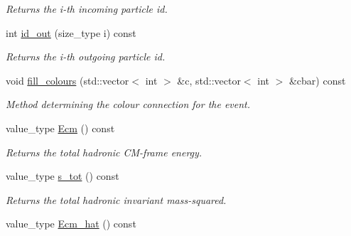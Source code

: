 \begin{DoxyCompactItemize}
\begin{DoxyCompactList}\small\item\em Returns the i-\/th incoming particle id. \end{DoxyCompactList}\item 
\hypertarget{a00212_aaa6968384f596478f21840491ceabad4}{}int \hyperlink{a00212_aaa6968384f596478f21840491ceabad4}{id\+\_\+out} (size\+\_\+type i) const \label{a00212_aaa6968384f596478f21840491ceabad4}

\begin{DoxyCompactList}\small\item\em Returns the i-\/th outgoing particle id. \end{DoxyCompactList}\item 
\hypertarget{a00212_ab6c23b5b397048e7900ea14cc07f45fc}{}void \hyperlink{a00212_ab6c23b5b397048e7900ea14cc07f45fc}{fill\+\_\+colours} (std\+::vector$<$ int $>$ \&c, std\+::vector$<$ int $>$ \&cbar) const \label{a00212_ab6c23b5b397048e7900ea14cc07f45fc}

\begin{DoxyCompactList}\small\item\em Method determining the colour connection for the event. \end{DoxyCompactList}\item 
\hypertarget{a00212_ad7d0811b50df49cd86bedbcc79f05e6f}{}value\+\_\+type \hyperlink{a00212_ad7d0811b50df49cd86bedbcc79f05e6f}{Ecm} () const \label{a00212_ad7d0811b50df49cd86bedbcc79f05e6f}

\begin{DoxyCompactList}\small\item\em Returns the total hadronic C\+M-\/frame energy. \end{DoxyCompactList}\item 
\hypertarget{a00212_a2a483bce8138485806cf5ef7d8d9ab44}{}value\+\_\+type \hyperlink{a00212_a2a483bce8138485806cf5ef7d8d9ab44}{s\+\_\+tot} () const \label{a00212_a2a483bce8138485806cf5ef7d8d9ab44}

\begin{DoxyCompactList}\small\item\em Returns the total hadronic invariant mass-\/squared. \end{DoxyCompactList}\item 
\hypertarget{a00212_acd66edc648589315d436008b7544148f}{}value\+\_\+type \hyperlink{a00212_acd66edc648589315d436008b7544148f}{Ecm\+\_\+hat} () const \label{a00212_acd66edc648589315d436008b7544148f}


\end{DoxyCompactItemize}
